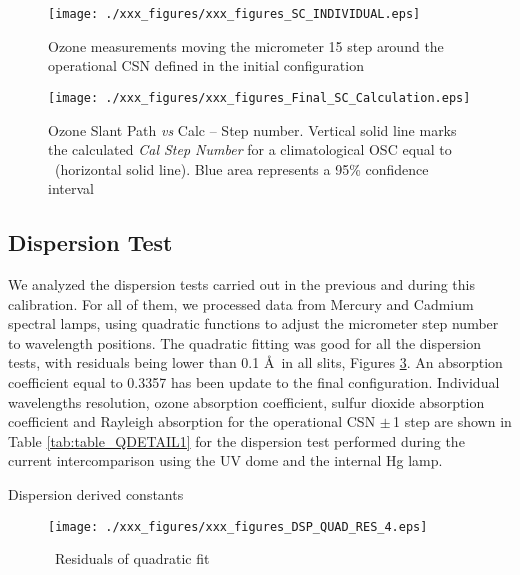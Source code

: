 \begin{figure}[hbtp!]
\begin{center}
		\texttt{[image: ./xxx\_figures/xxx\_figures\_SC\_INDIVIDUAL.eps]}
		\caption{Ozone measurements moving the micrometer 15 step around the operational CSN defined in the initial configuration}
		\label{fig:xxx_figures_SC_INDIVIDUAL}
\end{center}
\end{figure}

\begin{figure}[hbtp!]
\begin{center}
\texttt{[image: ./xxx\_figures/xxx\_figures\_Final\_SC\_Calculation.eps]}
  \caption{Ozone Slant Path \emph{vs} Calc -- Step number. Vertical solid line marks the calculated \emph{Cal Step Number} for a climatological OSC equal to \textbf{\STATIONOSC}\ (horizontal solid line). Blue area represents a 95\% confidence interval}
\label{fig:Final_SC_Calculation}

\end{center}
\end{figure}

\newpage
\subsection{Dispersion Test} \label{subsec:DSP}
We analyzed the dispersion tests carried out in the previous and during this calibration. For all of them, we processed data from Mercury and Cadmium spectral lamps, using quadratic functions to adjust the micrometer step number to wavelength positions.
The quadratic fitting was good for all the dispersion tests, with residuals being lower than 0.1 \AA\ in all slits, Figures \ref{fig:DSP_QUAD_RES_1}. An absorption coefficient equal to 0.3357 has been update to the final configuration.
Individual wavelengths resolution, ozone absorption coefficient, sulfur dioxide absorption coefficient and Rayleigh absorption for the operational CSN $\pm$\,1 step are shown in Table \ref{tab:table_QDETAIL1} for the dispersion test performed during the current intercomparison using the UV dome and the internal Hg lamp. 

\begin{table}[b] 
\centering
		\caption{Dispersion derived constants}
		\label{tab:table_dsp}
			
\end{table}

\begin{figure}[hbtp!]
\begin{center}
		\texttt{[image: ./xxx\_figures/xxx\_figures\_DSP\_QUAD\_RES\_4.eps]}
		\caption{\calyear\ Residuals of quadratic fit}
		\label{fig:DSP_QUAD_RES_1}
\end{center}
\end{figure}

